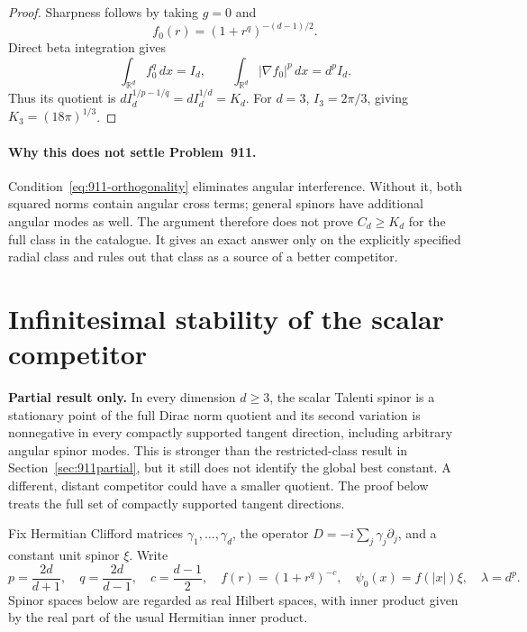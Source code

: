\documentclass[11pt,a4paper]{article}
\theoremstyle{remark}
\begin{document}
\begin{proof}
Sharpness follows by taking $g=0$ and
\[
 f_0(r)=(1+r^q)^{-(d-1)/2}.
\]
Direct beta integration gives
\[
 \int_{\mathbb R^d}f_0^q\,dx=I_d,
 \qquad
 \int_{\mathbb R^d}|\nabla f_0|^p\,dx=d^pI_d.
\]
Thus its quotient is $dI_d^{1/p-1/q}=dI_d^{1/d}=K_d$. For $d=3$,
$I_3=2\pi/3$, giving $K_3=(18\pi)^{1/3}$.
\end{proof}

\paragraph{Why this does not settle Problem~911.}
Condition~\eqref{eq:911-orthogonality} eliminates angular interference.
Without it, both squared norms contain angular cross terms; general
spinors have additional angular modes as well. The argument therefore
does not prove $C_d\ge K_d$ for the full class in the catalogue. It gives
an exact answer only on the explicitly specified radial class and rules
out that class as a source of a better competitor.


\section{Infinitesimal stability of the scalar competitor}
\label{sec:911stability}

\textbf{Partial result only.} In every dimension $d\ge3$, the scalar
Talenti spinor is a stationary point of the full Dirac norm quotient and
its second variation is nonnegative in every compactly supported tangent
direction, including arbitrary angular spinor modes. This is stronger
than the restricted-class result in Section~\ref{sec:911partial}, but it
still does not identify the global best constant. A different, distant
competitor could have a smaller quotient. The proof below treats the full set of compactly supported tangent directions.

Fix Hermitian Clifford matrices $\gamma_1,\ldots,\gamma_d$, the operator
$D=-i\sum_j\gamma_j\partial_j$, and a constant unit spinor $\xi$. Write
\[
 p=\frac{2d}{d+1},\quad q=\frac{2d}{d-1},\quad
 c=\frac{d-1}{2},\quad f(r)=(1+r^q)^{-c},\quad
 \psi_0(x)=f(|x|)\xi,\quad\lambda=d^p.
\]
Spinor spaces below are regarded as real Hilbert spaces, with inner
product given by the real part of the usual Hermitian inner product.
\end{document}
